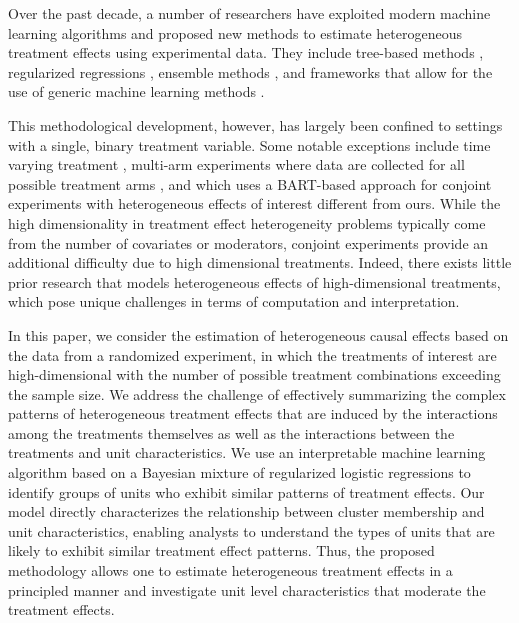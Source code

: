 Over the past decade, a number of researchers have exploited modern
machine learning algorithms and proposed new methods to estimate
heterogeneous treatment effects using experimental data.  They include
tree-based methods
\citep[e.g.,][]{imai:stra:11,athe:imbe:16,wage:athe:18,hahn:murr:carv:20},
regularized regressions \citep[e.g.,][]{imai:ratk:13, tian:etal:14,
  kunz:etal:19}, ensemble methods \citep[e.g.,][]{vand:rose:11,
  grim:mess:west:17}, and frameworks that allow for the use of
generic machine learning methods
\citep[e.g.,][]{cher:etal:19,imai:li:21}.

This methodological development, however, has largely been confined to
settings with a single, binary treatment variable.
Some notable
exceptions include time varying treatment
\citep[e.g.,][]{almirall2014time}, multi-arm experiments where data
are collected for all possible treatment arms
\citep[e.g.,][]{imai:ratk:13}, and \cite{robinsondetect} which uses a
BART-based approach for conjoint experiments with heterogeneous
effects of interest different from ours.  While the high
dimensionality in treatment effect heterogeneity problems typically
come from the number of covariates or moderators, conjoint experiments
provide an additional difficulty due to high dimensional treatments.
Indeed, there exists little prior research that models heterogeneous
effects of high-dimensional treatments, which pose unique challenges
in terms of computation and interpretation.

In this paper, we consider the estimation of heterogeneous causal
effects based on the data from a randomized experiment, in which the
treatments of interest are high-dimensional with the number of
possible treatment combinations exceeding the sample size.  We address
the challenge of effectively summarizing the complex patterns of
heterogeneous treatment effects that are induced by the interactions
among the treatments themselves as well as the interactions between
the treatments and unit characteristics.  We use an interpretable
machine learning algorithm based on a Bayesian mixture of regularized
logistic regressions to identify groups of units who exhibit similar
patterns of treatment effects.  Our model directly characterizes the
relationship between cluster membership and unit characteristics,
enabling analysts to understand the types of units that are likely to
exhibit similar treatment effect patterns.  Thus, the proposed
methodology allows one to estimate heterogeneous treatment effects in
a principled manner and investigate unit level characteristics that
moderate the treatment effects.

